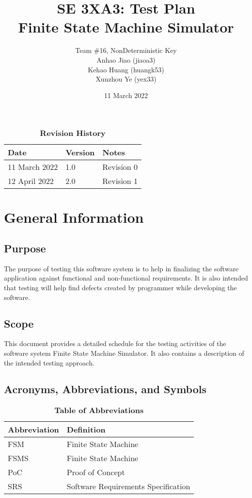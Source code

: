 \documentclass[12pt, titlepage]{article}
\title{SE 3XA3: Test Plan\\Finite State Machine Simulator}
\author{
  Team \#16, NonDeterministic Key \\
  Anhao Jiao (jiaoa3) \\
  Kehao Huang (huangk53) \\
  Xunzhou Ye (yex33)
}
\date{11 March 2022}
\begin{document}
\maketitle

\tableofcontents
\listoftables
\listoffigures

\begin{table}[bp]
\caption{\bf Revision History}
\begin{tabularx}{\textwidth}{p{3cm}p{2cm}X}
\toprule {\bf Date} & {\bf Version} & {\bf Notes}\\
\midrule
11 March 2022 & 1.0 & Revision 0\\
12 April 2022 & 2.0 & Revision 1\\
\bottomrule
\end{tabularx}
\end{table}

\newpage
\tableofcontents
{}

\section{General Information}

\subsection{Purpose}
The purpose of testing this software system is to help in finalizing the
software application against functional and non-functional requirements. It is
also intended that testing will help find defects created by programmer while developing the software.
\subsection{Scope}
This document provides a detailed schedule for the testing activities of the
software system Finite State Machine Simulator. It also contains a description
of the intended testing approach. 

\subsection{Acronyms, Abbreviations, and Symbols}
	
\begin{table}[hbp]
\caption{\textbf{Table of Abbreviations}} \label{Table}

\begin{tabularx}{\textwidth}{p{3cm}X}
\toprule
\textbf{Abbreviation} & \textbf{Definition} \\
\midrule
FSM & Finite State Machine\\
FSMS & Finite State Machine\\
PoC & Proof of Concept\\
SRS & Software Requirements Specification\\  
\bottomrule
\end{tabularx}

\end{table}
\end{document}
